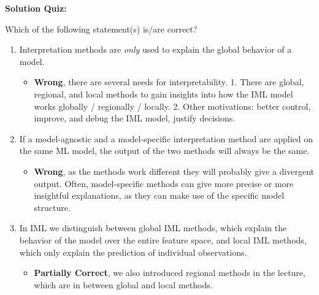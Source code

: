 \textbf{Solution Quiz:}\\\noindent
\medskip

Which of the following statement(s) is/are correct?  
	\begin{enumerate}
        \item Interpretation methods are \textit{only} used to explain the global behavior of a model.
        \begin{itemize}
        	\item[$\Rightarrow$] \textbf{Wrong}, there are several needs for interpretability. 1. There are global, regional, and local methods to gain insights into how the IML model works globally / regionally / locally. 2. Other motivations: better control, improve, and debug the IML model, justify decisions.
        \end{itemize}
    	\item If a model-agnostic and a model-specific interpretation method are applied on the same ML model, the output of the two methods will always be the same.
    	\begin{itemize}
    		\item[$\Rightarrow$] \textbf{Wrong}, as the methods work different they will probably give a divergent output. Often, model-specific methods can give more precise or more insightful explanations, as they can make use of the specific model structure.
    	\end{itemize}
    	\item In IML we distinguish between global IML methods, which explain the behavior of the model over the entire feature space, and local IML methods, which only explain the prediction of individual observations. 
    	\begin{itemize}
    		\item[$\Rightarrow$] \textbf{Partially Correct}, we also introduced regional methods in the lecture, which are in between global and local methods.
    	\end{itemize}
		   

\end{enumerate}
